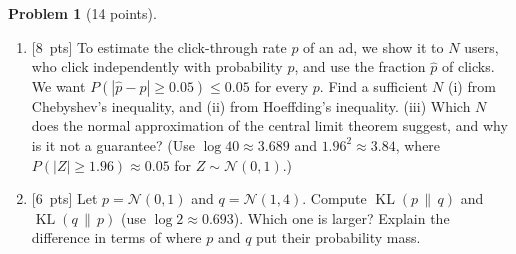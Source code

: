 \documentclass[11pt]{article}
\theoremstyle{definition}
\newtheorem{problem}{Problem}
\newcommand{\pts}[1]{\textup{[#1~pts]}}
\DeclareMathOperator{\KL}{KL}
\begin{document}
\begin{problem}[14 points]\label{pr:fin-concentration-kl}
    \begin{enumerate}[label=(\alph*)]
        \item \pts{8} To estimate the click-through rate $p$ of an ad, we show it to $N$ users, who click independently with probability $p$, and use the fraction $\hat p$ of clicks. We want $P(|\hat p - p| \geq 0.05) \leq 0.05$ for every $p$. Find a sufficient $N$ (i) from Chebyshev's inequality, and (ii) from Hoeffding's inequality. (iii) Which $N$ does the normal approximation of the central limit theorem suggest, and why is it not a guarantee? (Use $\log 40 \approx 3.689$ and $1.96^2 \approx 3.84$, where $P(|Z| \geq 1.96) \approx 0.05$ for $Z \sim \mathcal{N}(0, 1)$.)
        \item \pts{6} Let $p = \mathcal{N}(0, 1)$ and $q = \mathcal{N}(1, 4)$. Compute $\KL(p \,\|\, q)$ and $\KL(q \,\|\, p)$ (use $\log 2 \approx 0.693$). Which one is larger? Explain the difference in terms of where $p$ and $q$ put their probability mass.
    \end{enumerate}
\end{problem}
\end{document}
